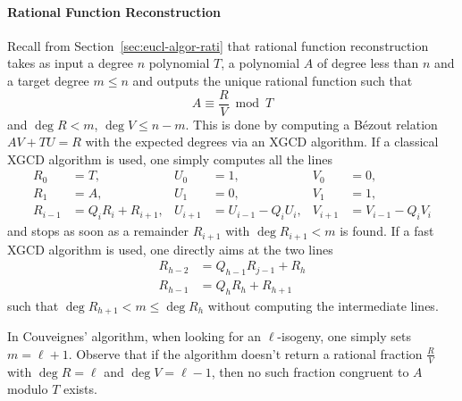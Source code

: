 \paragraph{Rational Function Reconstruction}
Recall from Section~\ref{sec:eucl-algor-rati} that rational function
reconstruction takes as input a degree $n$ polynomial $T$, a
polynomial $A$ of degree less than $n$ and a target degree $m\le n$
and outputs the unique rational function such that
\begin{equation*}
  A \equiv \frac{R}{V} \bmod T
\end{equation*}
and $\deg R < m$, $\deg V \le n-m$. This is done by computing a Bézout
relation $AV + TU = R$ with the expected degrees via an XGCD
algorithm. If a classical XGCD algorithm is used, one simply computes
all the lines
\begin{equation}
  \label{eq:XGCD}
  \begin{aligned}
    R_0 &= T, & U_0 &= 1, & V_0 &= 0,\\
    R_1 &= A, & U_1 &= 0, & V_1 &= 1,\\
    R_{i-1} &= Q_iR_i + R_{i+1}, & U_{i+1} &= U_{i-1}-Q_iU_i, & V_{i+1} &= V_{i-1}-Q_iV_i
  \end{aligned}
\end{equation}
and stops as soon as a remainder $R_{i+1}$ with $\deg R_{i+1}<m$ is
found. If a fast XGCD algorithm is used, one directly aims at the two
lines
\begin{equation}
  \label{eq:FastGCD}
  \begin{aligned}
    R_{h-2} &= Q_{h-1}R_{j-1} + R_h\\
    R_{h-1} &= Q_hR_h + R_{h+1}
  \end{aligned}
\end{equation}
such that $\deg R_{h+1} < m \le \deg R_h$ without computing the
intermediate lines.

In Couveignes' algorithm, when looking for an $\ell$-isogeny, one
simply sets $m=\ell+1$. Observe that if the algorithm doesn't return a
rational fraction $\frac{R}{V}$ with $\deg R = \ell$ and $\deg V =
\ell -1 $, then no such fraction congruent to $A$ modulo $T$ exists.

